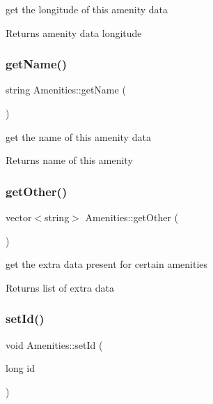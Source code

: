 get the longitude of this amenity data \begin{DoxyReturn}{Returns}
amenity data longitude 
\end{DoxyReturn}
\mbox{\label{class_amenities_a9733cccc5b0e5ffaf76d96b414a5c5f2}} 
\subsubsection{\texorpdfstring{get\+Name()}{getName()}}
{\footnotesize\ttfamily string Amenities\+::get\+Name (\begin{DoxyParamCaption}{ }\end{DoxyParamCaption})\hspace{0.3cm}{\ttfamily [inline]}}

get the name of this amenity data \begin{DoxyReturn}{Returns}
name of this amenity 
\end{DoxyReturn}
\mbox{\label{class_amenities_ad160432cc2dc13c82d7fd88019a95864}} 
\subsubsection{\texorpdfstring{get\+Other()}{getOther()}}
{\footnotesize\ttfamily vector$<$string$>$ Amenities\+::get\+Other (\begin{DoxyParamCaption}{ }\end{DoxyParamCaption})\hspace{0.3cm}{\ttfamily [inline]}}

get the extra data present for certain amenities \begin{DoxyReturn}{Returns}
list of extra data 
\end{DoxyReturn}
\mbox{\label{class_amenities_a69f80fffcfde16620ff7d56a33c878c9}} 
\subsubsection{\texorpdfstring{set\+Id()}{setId()}}
{\footnotesize\ttfamily void Amenities\+::set\+Id (\begin{DoxyParamCaption}\item[{long}]{id }\end{DoxyParamCaption})\hspace{0.3cm}{\ttfamily [inline]}}

